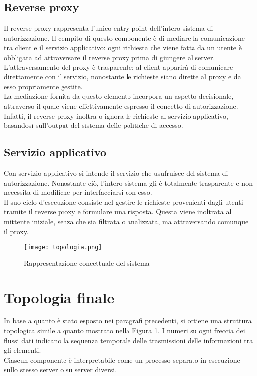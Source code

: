 \subsection{Reverse proxy}
Il reverse proxy rappresenta l'unico entry-point dell'intero sistema di autorizzazione. Il compito di questo componente è di
mediare la comunicazione tra client e il servizio applicativo: ogni richiesta che viene fatta da un utente è obbligata ad attraversare 
il reverse proxy prima di giungere al server. 
\\ L'attraversamento del proxy è trasparente: al client apparirà di comunicare direttamente con il servizio, nonostante le richieste siano dirette al proxy e da esso propriamente gestite. 
\\ La mediazione fornita da questo elemento incorpora un aspetto decisionale, attraverso il quale viene effettivamente espresso il concetto di autorizzazione. 
Infatti, il reverse proxy inoltra o ignora le richieste al servizio applicativo, basandosi sull'output del sistema delle politiche di accesso.  
 

\subsection{Servizio applicativo} \label{serv_server}
Con servizio applicativo si intende il servizio che usufruisce del sistema di autorizzazione. 
Nonostante ciò, l'intero sistema gli è totalmente trasparente e non necessita di modifiche per interfacciarsi con esso.
\\Il suo ciclo d'esecuzione consiste nel gestire 
le richieste provenienti dagli utenti tramite
 il reverse proxy e formulare una risposta.
Questa viene inoltrata al mittente iniziale, senza che sia filtrata o analizzata, ma attraversando comunque il proxy.

\begin{figure}[h]
    \texttt{[image: topologia.png]}
    \centering
    \caption{Rappresentazione concettuale del sistema}
    \label{topologia}
\end{figure}

\section{Topologia finale}
In base a quanto è stato esposto nei paragrafi precedenti, si ottiene una struttura topologica simile a quanto mostrato nella Figura \ref{topologia}. 
I numeri su ogni freccia dei flussi dati indicano la sequenza temporale delle trasmissioni delle informazioni tra gli elementi. 
\\Ciascun componente è interpretabile come un processo separato in esecuzione sullo stesso server o su server diversi. 
